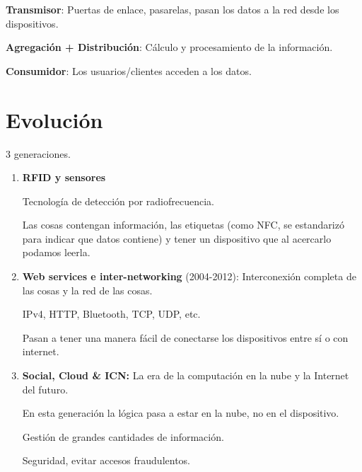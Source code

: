 \documentclass[12pt, twoside, openright]{report} %
\begin{document}
\textbf{Transmisor}: Puertas de enlace, pasarelas, pasan los datos a la
red desde los dispositivos.

\textbf{Agregación + Distribución}: Cálculo y procesamiento de la
información.

\textbf{Consumidor}: Los usuarios/clientes acceden a los datos.

\section{Evolución}

3 generaciones.

\begin{enumerate}
	\def\labelenumi{\arabic{enumi}.}
	\item \textbf{RFID y sensores}

	      Tecnología de detección por radiofrecuencia.

	      Las cosas contengan información, las etiquetas (como NFC, se
	      estandarizó para indicar que datos contiene) y tener un dispositivo
	      que al acercarlo podamos leerla.
	\item \textbf{Web services e inter-networking} (2004-2012): Interconexión
	      completa de las cosas y la red de las cosas.

	      IPv4, HTTP, Bluetooth, TCP, UDP, etc.

	      Pasan a tener una manera fácil de conectarse los dispositivos entre sí
	      o con internet.
	\item \textbf{Social, Cloud \& ICN:} La era de la computación en la nube y
	      la Internet del futuro.

	      En esta generación la lógica pasa a estar en la nube, no en el
	      dispositivo.

	      Gestión de grandes cantidades de información.

	      Seguridad, evitar accesos fraudulentos.
\end{enumerate}
\end{document}
